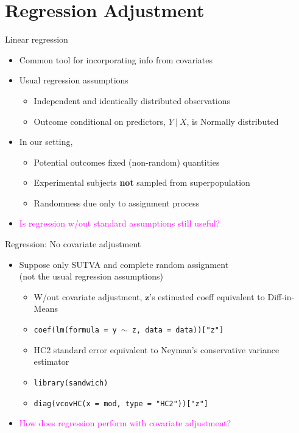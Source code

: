 \documentclass[table, xcolor = {dvipsnames}, 9pt]{beamer}
\newcommand\given[1][]{\:#1\vert\:}
\theoremstyle{plain}
\begin{document}
\section{Regression Adjustment}
\begin{frame}{Linear regression} \vfill
\begin{itemize} \vfill
\item Common tool for incorporating info from covariates \vfill
\item Usual regression assumptions \vfill
\begin{itemize} \vfill
\item Independent and identically distributed observations \vfill
\item Outcome conditional on predictors, $Y \given X$, is Normally distributed \vfill
\end{itemize} \vfill
\item In our setting, \vfill
\begin{itemize}
\item Potential outcomes fixed (non-random) quantities \vfill
\item Experimental subjects \textbf{not} sampled from superpopulation \vfill
\item Randomness due only to assignment process \vfill
\end{itemize}  
\item \textcolor{magenta}{Is regression w/out standard assumptions still useful?}
\end{itemize} \vfill
\end{frame}
\begin{frame}{Regression: No covariate adjustment} \vfill
\begin{itemize} \vfill
\item Suppose only SUTVA and complete random assignment \\ (not the usual regression assumptions) \vfill
\begin{itemize} \vfill
\item W/out covariate adjustment, $\bm{z}$'s estimated coeff equivalent to Diff-in-Means \vfill
\item[] \texttt{coef(lm(formula = y $\sim$ z, data = data))["z"]} \vfill
\item HC2 standard error equivalent to Neyman's conservative variance estimator \vfill
\item[] \texttt{library(sandwich)} \\ 
\item[] \texttt{diag(vcovHC(x = mod, type = "HC2"))["z"]}
\end{itemize} \vfill
\item \textcolor{magenta}{How does regression perform with covariate adjustment?} \\ \citep{freedman2008a,freedman2008b,lin2013,cohenfogarty2023} \vfill
\end{itemize} \vfill
\end{frame}
\end{document}
